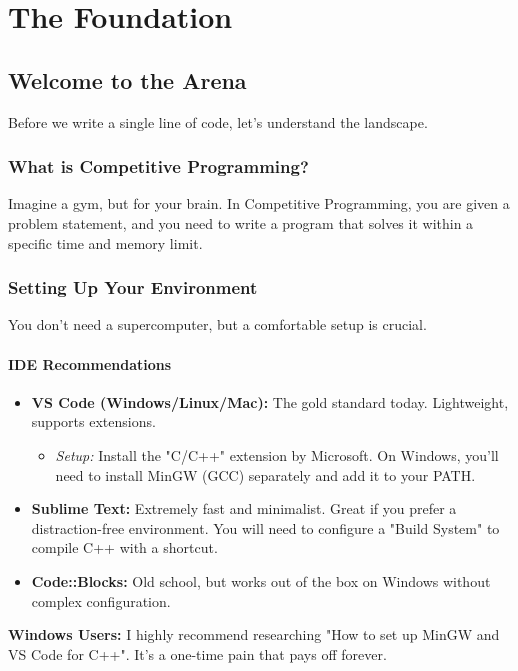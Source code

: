 \documentclass[12pt, a4paper]{report}
\begin{document}
\part{The Foundation}

\chapter{Welcome to the Arena}
Before we write a single line of code, let's understand the landscape.

\section{What is Competitive Programming?}
Imagine a gym, but for your brain. In Competitive Programming, you are given a problem statement, and you need to write a program that solves it within a specific time and memory limit.

\section{Setting Up Your Environment}
You don't need a supercomputer, but a comfortable setup is crucial.

\subsection{IDE Recommendations}
\begin{itemize}
    \item \textbf{VS Code (Windows/Linux/Mac):} The gold standard today. Lightweight, supports extensions.
    \begin{itemize}
        \item \textit{Setup:} Install the "C/C++" extension by Microsoft. On Windows, you'll need to install MinGW (GCC) separately and add it to your PATH.
    \end{itemize}
    \item \textbf{Sublime Text:} Extremely fast and minimalist. Great if you prefer a distraction-free environment. You will need to configure a "Build System" to compile C++ with a shortcut.
    \item \textbf{Code::Blocks:} Old school, but works out of the box on Windows without complex configuration.
\end{itemize}

\begin{hintbox}
\textbf{Windows Users:} I highly recommend researching "How to set up MinGW and VS Code for C++". It's a one-time pain that pays off forever.
\end{hintbox}
\end{document}
